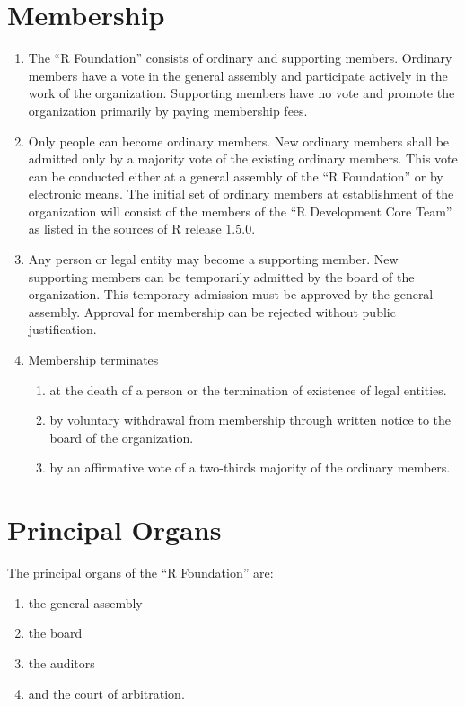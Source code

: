 \documentclass[a4paper]{article}
\newcommand{\RF}{``R Foundation''}
\begin{document}
\section{Membership}

\begin{enumerate}
 \item The \RF{} consists of ordinary and supporting
  members.  Ordinary members have a vote in the general assembly and
  participate actively in the work of the organization. Supporting
  members have no vote and promote the organization primarily by
  paying membership fees.
  
 \item Only people can become ordinary members. New ordinary
  members shall be admitted only by a majority vote of the existing
  ordinary members. This vote can be conducted either at a general
  assembly of the \RF{} or by electronic means.  The
  initial set of ordinary members at establishment of the organization
  will consist of the members of the ``R Development Core Team'' as
  listed in the sources of R release 1.5.0.
  
 \item Any person or legal entity may become a supporting member.  New
  supporting members can be temporarily admitted by the board of the
  organization.  This temporary admission must be approved by the
  general assembly.  Approval for membership can be rejected without
  public justification.

 \item Membership terminates
  \begin{enumerate}
   \item at the death of a person or the termination of
    existence of legal entities.
   \item by voluntary withdrawal from membership through written
    notice to the board of the organization.
   \item by an affirmative vote of a two-thirds majority of the
    ordinary members. 
  \end{enumerate}
\end{enumerate}
   

\section{Principal Organs}

The principal organs of the \RF{} are: 
\begin{enumerate}
 \item the general assembly
 \item the board
 \item the auditors
 \item and the court of arbitration.
\end{enumerate}
\end{document}

